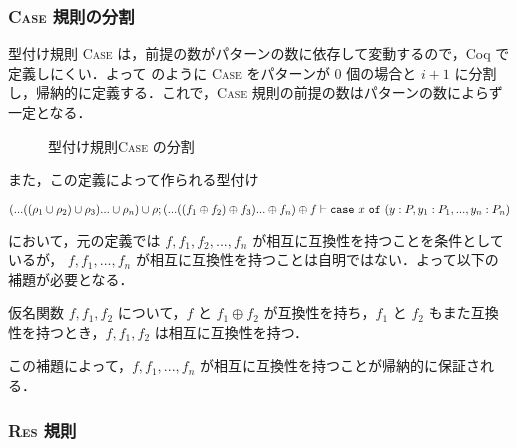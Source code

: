 \subsubsection{\textsc{Case} 規則の分割}

型付け規則 \textsc{Case} は，前提の数がパターンの数に依存して変動するので，Coq で定義しにくい．よって  のように \textsc{Case} をパターンが $0$ 個の場合と $i + 1$ に分割し，帰納的に定義する．これで，\textsc{Case} 規則の前提の数はパターンの数によらず一定となる．


\begin{figure*}[t]
  \vspace{14pt}

  \caption{型付け規則\textsc{Case} の分割}
  \label{api:case_split}
\end{figure*}


また，この定義によって作られる型付け
\begin{center}
  $(...((\rho_1 \cup \rho_2) \cup \rho_3)... \cup \rho_n) \cup \rho ; (...((f_1 \oplus f_2) \oplus f_3)... \oplus f_n) \oplus f \vdash {\tt case} \ x \ {\tt of} \ (y : P, y_1 : P_1, ..., y_n : P_n)$
\end{center}
において，元の定義では $f, f_1, f_2, ..., f_n$ が相互に互換性を持つことを条件としているが，
$f, f_1, ..., f_n$ が相互に互換性を持つことは自明ではない．よって以下の補題が必要となる．

\begin{lem}
  仮名関数 $f, f_1, f_2$ について，$f$ と $f_1 \oplus f_2$ が互換性を持ち，$f_1$ と $f_2$ もまた互換性を持つとき，$f, f_1, f_2$ は相互に互換性を持つ．
  \label{lem:compatible}
\end{lem}

この補題によって，$f, f_1, ... , f_n$ が相互に互換性を持つことが帰納的に保証される．%



\subsubsection{\textsc{Res} 規則}

